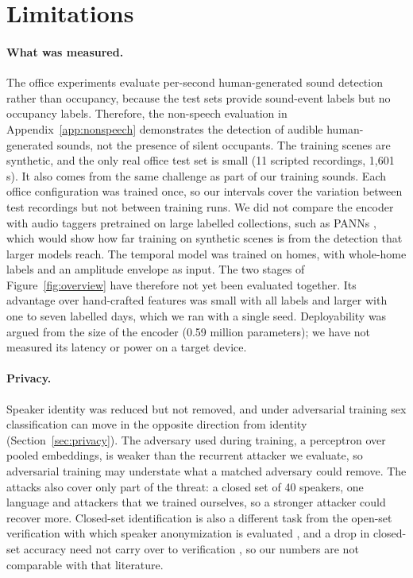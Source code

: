 \documentclass[11pt]{article}
\begin{document}
\section{Limitations}
\label{sec:limitations}

\paragraph{What was measured.} The office experiments evaluate per-second human-generated sound detection rather than occupancy, because the test sets provide sound-event labels but no occupancy labels. Therefore, the non-speech evaluation in Appendix~\ref{app:nonspeech} demonstrates the detection of audible human-generated sounds, not the presence of silent occupants. The training scenes are synthetic, and the only real office test set is small (11 scripted recordings, 1,601\,s). It also comes from the same challenge as part of our training sounds. Each office configuration was trained once, so our intervals cover the variation between test recordings but not between training runs. We did not compare the encoder with audio taggers pretrained on large labelled collections, such as PANNs \citep{kong2020panns}, which would show how far training on synthetic scenes is from the detection that larger models reach. The temporal model was trained on homes, with whole-home labels and an amplitude envelope as input. The two stages of Figure~\ref{fig:overview} have therefore not yet been evaluated together. Its advantage over hand-crafted features was small with all labels and larger with one to seven labelled days, which we ran with a single seed. Deployability was argued from the size of the encoder (0.59 million parameters); we have not measured its latency or power on a target device.

\paragraph{Privacy.} Speaker identity was reduced but not removed, and under adversarial training sex classification can move in the opposite direction from identity (Section~\ref{sec:privacy}). The adversary used during training, a perceptron over pooled embeddings, is weaker than the recurrent attacker we evaluate, so adversarial training may understate what a matched adversary could remove. The attacks also cover only part of the threat: a closed set of 40 speakers, one language and attackers that we trained ourselves, so a stronger attacker could recover more. Closed-set identification is also a different task from the open-set verification with which speaker anonymization is evaluated \citep{tomashenko2022voiceprivacy}, and a drop in closed-set accuracy need not carry over to verification \citep{srivastava2019privacy}, so our numbers are not comparable with that literature.
\end{document}
